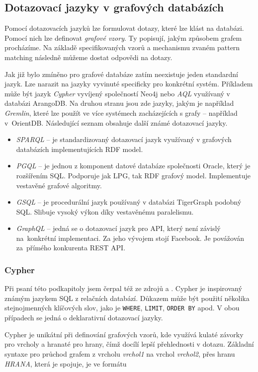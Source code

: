\documentclass[
  program=infoi,
  biblatex=true,
  figures=true,
  glossaries=false,
  index,
  sourcecodes=true
]{kidiplom}
\begin{document}
\subsection{Dotazovací jazyky v grafových databázích}
Pomocí dotazovacích jazyků lze formulovat dotazy, které lze klást na databázi. Pomocí nich lze definovat \textit{grafové vzory}. Ty popisují, jakým způsobem grafem procházíme. Na základě specifikovaných vzorů a mechanismu zvaném pattern matching následně můžeme dostat odpovědi na dotazy.

Jak již bylo zmíněno pro grafové databáze zatím neexistuje jeden standardní jazyk. Lze narazit na jazyky vyvinuté specificky pro konkrétní systém. Příkladem může být jazyk \textit{Cypher} vyvíjený společností Neo4j nebo \textit{AQL} využívaný v databázi ArangoDB. Na druhou stranu jsou zde jazyky, jakým je například \textit{Gremlin}, které lze použít ve více systémech zacházejících s grafy -- například v~OrientDB. Následující seznam obsahuje další známé dotazovací jazyky.
\begin{itemize}
\item \textit{SPARQL} -- je standardizovaný dotazovací jazyk využívaný v grafových databázích implementujících RDF model. \cite{sparql}
\item \textit{PGQL} -- je jednou z komponent datové databáze společnosti Oracle, který je rozšířením SQL. Podporuje jak LPG, tak RDF grafový model. Implementuje vestavěné grafové algoritmy.\cite{pgql}
\item \textit{GSQL} -- je procedurální jazyk používaný v databázi TigerGraph podobný SQL. Slibuje vysoký výkon díky vestavěnému paralelismu.\cite{gsql}
\item \textit{GraphQL} -- jedná se o dotazovací jazyk pro API, který není závislý na~konkrétní implementaci. Za jeho vývojem stojí Facebook. Je povážován za~přímého konkurenta REST API.\cite{graphql}
\end{itemize}

\subsubsection{Cypher}
Při psaní této podkapitoly jsem čerpal též ze zdrojů \cite{neo4jDoc} a \cite{neo4jDev}. Cypher je inspirovaný známým jazykem SQL z relačních databází. Důkazem může být použití několika stejnojmenných klíčových slov, jako je \texttt{WHERE}, \texttt{LIMIT}, \texttt{ORDER BY} apod. V obou případech se jedná o deklarativní dotazovací jazyky.

Cypher je unikátní při definování grafových vzorů, kde využívá kulaté závorky pro vrcholy a hranaté pro hrany, čímž docílí lepší přehlednosti v dotazu. Základní syntaxe pro průchod grafem z vrcholu \textit{vrchol1} na vrchol \textit{vrchol2}, přes hranu \textit{HRANA}, která je spojuje, je ve formátu 
\end{document}
